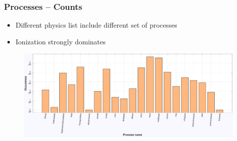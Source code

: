 \begin{frame}
\frametitle{Processes -- Counts}

\begin{block}{}
	\begin{itemize}
		\item Different physics list include different set of processes
		\item Ionization strongly dominates
	\end{itemize}
\end{block}

\begin{figure}
	\includegraphics[width=\textwidth]{images/process_dist_E120_phQGSP_INCLXX_HP.pdf}
\end{figure}

\end{frame}